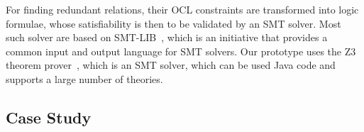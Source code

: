 For finding redundant relations, their \gls{OCL} constraints are transformed into logic formulae, whose satisfiability is then to be validated by an \gls{SMT} solver.
Most such solver are based on SMT-LIB~\cite{smtlib2017}, which is an initiative that provides a common input and output language for \gls{SMT} solvers.
Our prototype uses the Z3 theorem prover~\cite{z32008}, which is an \gls{SMT} solver, which can be used Java code and supports a large number of theories.





\subsection{Case Study}

